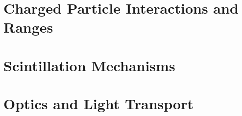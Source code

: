 \section{Charged Particle Interactions and Ranges}
\label{sec:InteractionsAndRange}


\section{Scintillation Mechanisms}
\label{sec:ScintMechanics}


\section{Optics and Light Transport}
\label{sec:OpticsTheory}
